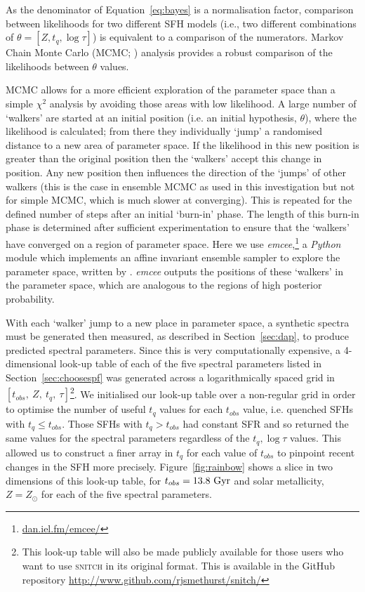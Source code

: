 \documentclass[useAMS,usenatbib]{mn2e}
\begin{document}
As the denominator of Equation~\ref{eq:bayes} is a normalisation factor, comparison between likelihoods for two different SFH models (i.e., two different combinations of $\theta = [Z, t_q, \log \tau]$) is equivalent to a comparison of the numerators. Markov Chain Monte Carlo (MCMC; \citealt{mackay03, emcee13, GW10}) analysis provides a robust comparison of the likelihoods between $\theta$ values.

MCMC allows for a more efficient exploration of the parameter space than a simple $\chi^2$ analysis by avoiding those areas with low likelihood. A large number of `walkers' are started at an initial position (i.e. an initial hypothesis, $\theta$), where the likelihood is calculated; from there they individually `jump' a randomised distance to a new area of parameter space. If the likelihood in this new position is greater than the original position then the `walkers' accept this change in position. Any new position then influences the direction of the  `jumps' of other walkers (this is the case in ensemble MCMC as used in this investigation but not for simple MCMC, which is much slower at converging). This is repeated for the defined number of steps after an initial `burn-in' phase. The length of this burn-in phase is determined after sufficient experimentation to ensure that the `walkers' have converged on a region of parameter space. Here we use \emph{emcee},\footnote{\url{dan.iel.fm/emcee/}} a \emph{Python} module which implements an affine invariant ensemble sampler to explore the parameter space, written by \cite{emcee13}. \emph{emcee} outputs the positions of these `walkers' in the parameter space, which are analogous to the regions of high posterior probability. 



With each `walker' jump to a new place in parameter space, a synthetic spectra must be generated then measured, as described in Section~\ref{sec:dap}, to produce predicted spectral parameters. Since this is very computationally expensive, a 4-dimensional look-up table of each of the five spectral parameters listed in Section~\ref{sec:choosespf} was generated across a logarithmically spaced grid in $[t_{obs},~Z,~t_q,~\tau]$\footnote{This look-up table will also be made publicly available for those users who want to use \textsc{snitch} in its original format. This is available in the GitHub repository \url{http://www.github.com/rjsmethurst/snitch/}}. We initialised our look-up table over a non-regular grid in order to optimise the number of useful $t_q$ values for each $t_{obs}$ value, i.e. quenched SFHs with $t_q \leq t_{obs}$. Those SFHs with $t_q > t_{obs}$ had constant SFR and so returned the same values for the spectral parameters regardless of the $t_q, \log\tau$ values. This allowed us to construct a finer array in $t_q$ for each value of $t_{obs}$ to pinpoint recent changes in the SFH more precisely. Figure~\ref{fig:rainbow} shows a slice in two dimensions of this look-up table, for $t_{obs} = 13.8~\rm{Gyr}$ and solar metallicity, $Z=Z_{\odot}$ for each of the five spectral parameters.
\end{document}
